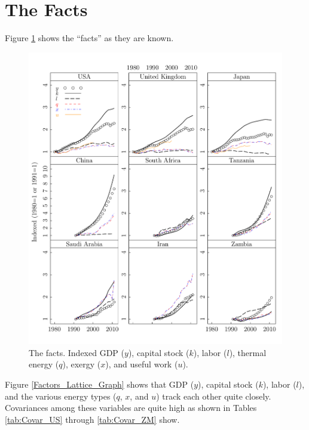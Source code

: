 \documentclass[preprint,authoryear,12pt]{elsarticle}\usepackage{graphicx, color}
\makeatletter
\def\maxwidth{ %
  \ifdim\Gin@nat@width>\linewidth
    \linewidth
  \else
    \Gin@nat@width
  \fi
}
\newenvironment{knitrout}{}{} %
\makeatother
\begin{document}
\section{The Facts}

Figure \ref{fig:Factors_Lattice_Graph} shows the ``facts'' as they are known.

\begin{knitrout}
\color{fgcolor}\begin{figure}[]

\includegraphics[width=\maxwidth]{figure/Factors_Lattice_Graph} \caption[The facts]{The facts. Indexed GDP ($y$), capital stock ($k$), labor ($l$), thermal energy ($q$), exergy ($x$), and useful work ($u$).\label{fig:Factors_Lattice_Graph}}
\end{figure}


\end{knitrout}


Figure \ref{Factors_Lattice_Graph} shows that GDP ($y$), capital stock ($k$), labor ($l$), and the various energy types ($q$, $x$, and $u$) track each other quite closely. Covariances among these variables are quite high as shown in Tables \ref{tab:Covar_US} through \ref{tab:Covar_ZM} show.
\end{document}
